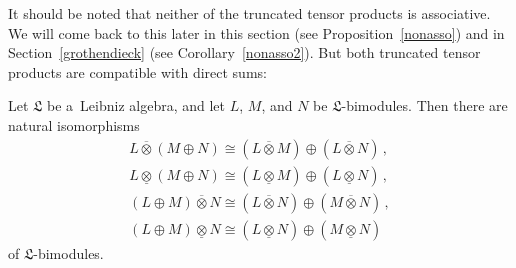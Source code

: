 \documentclass{jonasart}
\newcommand{\lf}{\mathfrak{L}}
\newcommand{\ovo}{\overline{\otimes}}
\newcommand{\und}{\underline{\otimes}}
\begin{document}
	It should be noted that neither of the truncated tensor products is associative. We will come back to this later in this section
	(see Proposition~\ref{nonasso}) and in Section~\ref{grothendieck}
	(see Corollary~\ref{nonasso2}). But both truncated tensor products are compatible with direct sums:
	\begin{proposition}
		Let $\lf$ be a~Leibniz algebra, and let $L$, $M$, and $N$ be
		$\lf$-bimodules. Then there are natural isomorphisms
		\begin{gather*}
			L\ovo(M\oplus N)\cong(L\ovo M)\oplus(L\ovo N)\,, \\
			L\und(M\oplus N)\cong(L\und M)\oplus(L\und N)\,, \\
			(L\oplus M)\ovo N\cong(L\ovo N)\oplus(M\ovo N)\,, \\
			(L\oplus M)\und N\cong(L\und N)\oplus(M\und N)
		\end{gather*}
		of $\lf$-bimodules.
	\end{proposition}
\end{document}
